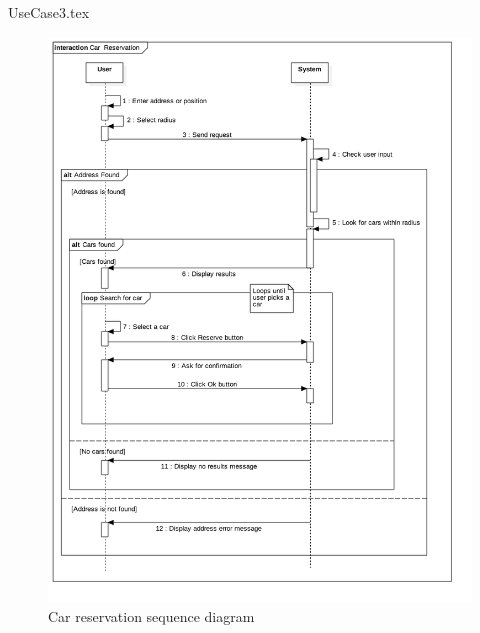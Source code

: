 \documentclass[12pt]{article}
\begin{document}
		\FloatBarrier
		{UseCase3.tex}
		\newpage
		\begin{figure}[htbp]
		 \caption{Car reservation sequence diagram}
		\includegraphics[scale=0.49]{Images/SequenceDiagram/CarReservation.png}
 	 	\end{figure}
 	 	\clearpage
		 
\end{document}
